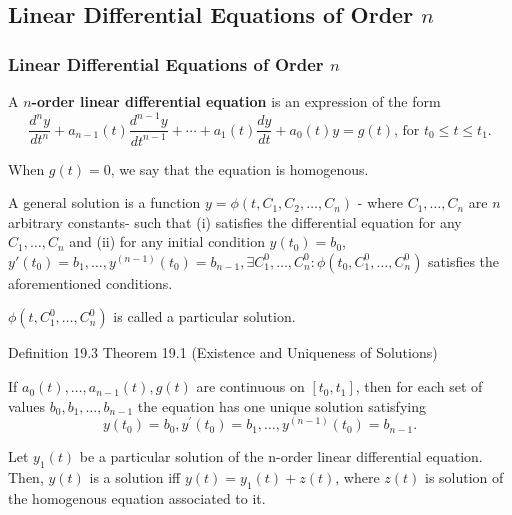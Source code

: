 \subsection{Linear Differential Equations of Order $n$}

\subsubsection{Linear Differential Equations of Order $n$}

\begin{definition}
    A \textbf{$n$-order linear differential equation} is an expression of the form \[
        \frac{d^ny}{dt^n} + a_{n-1}(t)\frac{d ^{n-1}y}{dt ^{n-1}} + \cdots + a_1(t)\frac{dy}{dt} + a_0(t)y = g(t), \, \text{for } t_0 \leq t \leq t_1.
    \]

    When $g(t) = 0$, we say that the equation is homogenous.
\end{definition}

\begin{definition}
    A general solution is a function \(y = \phi (t, C_{1}, C_{2}, \ldots , C_{n})\) - where \(C_{1}, \ldots , C_{n}\) are \(n\) arbitrary constants- such that (i) satisfies the differential equation for any \(C_{1}, \ldots , C_{n}\) and (ii) for any initial condition \(y(t_{0}) = b_{0}\), \(y'(t_{0}) = b_{1}, \ldots , y^{(n - 1)}(t_{0}) = b_{n - 1}, \exists C_{1}^{0}, \ldots , C_{n}^{0}: \phi (t_{0}, C_{1}^{0}, \ldots , C_{n}^{0})\) satisfies the aforementioned conditions.
\end{definition}

\begin{definition}
    \(\phi (t, C_{1}^{0}, \ldots , C_{n}^{0})\) is called a particular solution.
\end{definition}
Definition 19.3
Theorem 19.1 (Existence and Uniqueness of Solutions)
\begin{theorem}
    If \(a_{0}(t), \ldots , a_{n - 1}(t), g(t)\) are continuous on \([t_{0}, t_{1}]\), then for each set of values \(b_{0}, b_{1}, \ldots , b_{n - 1}\) the equation has one unique solution satisfying
    \[
        y(t_{0}) = b_{0}, y^{\prime}(t_{0}) = b_{1},\ldots , y^{(n - 1)}(t_{0}) = b_{n - 1}.
    \]
\end{theorem}

\begin{theorem}
    Let \(y_{1}(t)\) be a particular solution of the n-order linear differential equation. Then, \(y(t)\) is a solution iff \(y(t) = y_{1}(t) + z(t)\), where \(z(t)\) is solution of the homogenous equation associated to it.
\end{theorem}


